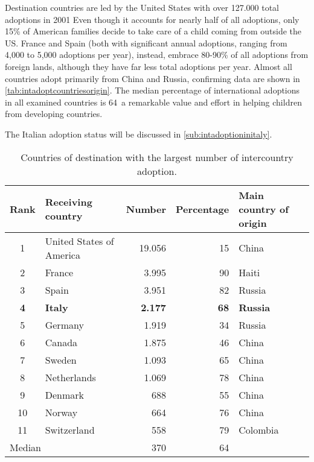 Destination countries are led by the United States with over 127.000 total adoptions in 2001 Even though it accounts for nearly half of all adoptions, only 15\% of American families decide to take care of a child coming from outside the US. France and Spain (both with significant annual adoptions, ranging from 4,000 to 5,000 adoptions per year), instead, embrace 80-90\% of all adoptions from foreign lands, although they have far less total adoptions per year. Almost all countries adopt primarily from China and Russia, confirming data are shown in \ref{tab:intadoptcountriesorigin}. The median percentage of international adoptions in all examined countries is 64\, a remarkable value and effort in helping children from developing countries.

The Italian adoption status will be discussed in \ref{sub:intadoptioninitaly}.

\begin{table}[H]
   \centering
   \begin{tabular}{c l r r l}
      Rank & Receiving country\footnotemark[1] & Number & Percentage & Main country of origin\\
      \hline
      1 & United States of America & 19.056 & 15 & China\\
      2 & France & 3.995 & 90 & Haiti\\
      3 & Spain & 3.951 & 82 & Russia\\
      \textcolor{BrickRed}{\textbf{4}} & \textcolor{BrickRed}{\textbf{Italy}} & \textcolor{BrickRed}{\textbf{2.177}} & \textcolor{BrickRed}{\textbf{68}} & \textcolor{BrickRed}{\textbf{Russia}}\\
      5 & Germany & 1.919 & 34 & Russia\\
      6 & Canada & 1.875 & 46 & China\\
      7 & Sweden & 1.093 & 65 & China\\
      8 & Netherlands & 1.069 & 78 & China\\
      9 & Denmark & 688 & 55 & China\\
      10 & Norway & 664 & 76 & China\\
      11 & Switzerland & 558 & 79 & Colombia\\
      \hline
      \multicolumn{2}{l}{Median} & 370 & 64 &\\
   \end{tabular}
   \caption{Countries of destination with the largest number of intercountry adoption.}
    \label{tab:intadoptcountriesdestination}
\end{table}

